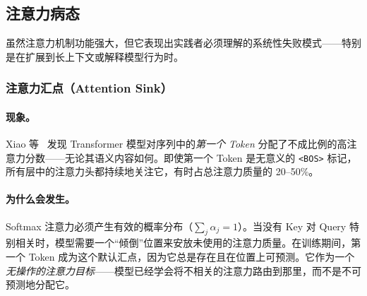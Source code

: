 \subsection{注意力病态}
\label{attention-pathologies}

虽然注意力机制功能强大，但它表现出实践者必须理解的系统性失败模式——特别是在扩展到长上下文或解释模型行为时。

\subsubsection{注意力汇点（Attention Sink）}
\label{attention-sink}

\paragraph{现象。}
\label{the-phenomenon.}

Xiao 等~\cite{xiao2024efficient} 发现 Transformer 模型对序列中的\emph{第一个 Token} 分配了不成比例的高注意力分数——无论其语义内容如何。即使第一个 Token 是无意义的 \texttt{<BOS>} 标记，所有层中的注意力头都持续地关注它，有时占总注意力质量的 20--50\%。

\paragraph{为什么会发生。}
\label{why-it-happens.}

Softmax 注意力必须产生有效的概率分布（$\sum_j \alpha_j = 1$）。当没有 Key 对 Query 特别相关时，模型需要一个``倾倒''位置来安放未使用的注意力质量。在训练期间，第一个 Token 成为这个默认汇点，因为它总是存在且在位置上可预测。它作为一个\emph{无操作的注意力目标}——模型已经学会将不相关的注意力路由到那里，而不是不可预测地分配它。

